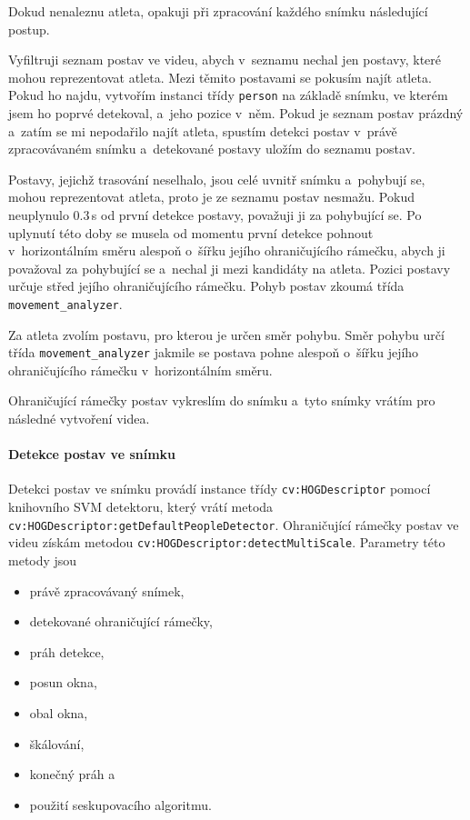 Dokud nenaleznu atleta, opakuji při zpracování každého snímku následující postup.

Vyfiltruji seznam postav ve videu, abych v~seznamu nechal jen postavy, které mohou reprezentovat atleta. Mezi těmito postavami se pokusím najít atleta. Pokud ho najdu, vytvořím instanci třídy \texttt{person} na základě snímku, ve kterém jsem ho poprvé detekoval, a~jeho pozice v~něm. Pokud je seznam postav prázdný a~zatím se mi nepodařilo najít atleta, spustím detekci postav v~právě zpracovávaném snímku a~detekované postavy uložím do seznamu postav.

Postavy, jejichž trasování neselhalo, jsou celé uvnitř snímku a~pohybují se, mohou reprezentovat atleta, proto je ze seznamu postav nesmažu. Pokud neuplynulo $0.3$\,\rm s od první detekce postavy, považuji ji za pohybující se. Po uplynutí této doby se musela od momentu první detekce pohnout v~horizontálním směru alespoň o~šířku jejího ohraničujícího rámečku, abych ji považoval za pohybující se a~nechal ji mezi kandidáty na atleta. Pozici postavy určuje střed jejího ohraničujícího rámečku. Pohyb postav zkoumá třída \texttt{movement\_analyzer}.

Za atleta zvolím postavu, pro kterou je určen směr pohybu. Směr pohybu určí třída \texttt{movement\_analyzer} jakmile se postava pohne alespoň o~šířku jejího ohraničujícího rámečku v~horizontálním směru.

Ohraničující rámečky postav vykreslím do snímku a~tyto snímky vrátím pro následné vytvoření videa.

\paragraph{Detekce postav ve snímku}

Detekci postav ve snímku provádí instance třídy \texttt{cv\::HOGDescriptor} pomocí knihovního SVM detektoru, který vrátí metoda \texttt{cv\::HOGDescriptor\::getDefaultPeopleDetector}. Ohraničující rámečky postav ve videu získám metodou \texttt{cv\::HOGDescriptor\::detectMultiScale}. Parametry této metody jsou
\begin{itemize}
    \item právě zpracovávaný snímek,
    \item detekované ohraničující rámečky,
    \item práh detekce,
    \item posun okna,
    \item obal okna,
    \item škálování,
    \item konečný práh a
    \item použití seskupovacího algoritmu.
\end{itemize}

